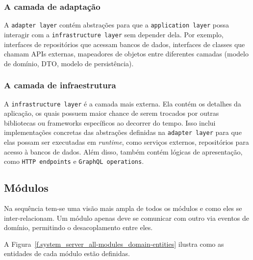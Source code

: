 \subsubsection{A camada de adaptação}

A \texttt{adapter layer} contém abstrações para que a \texttt{application layer} possa interagir com a \texttt{infrastructure layer} sem depender dela. Por exemplo, interfaces de repositórios que acessam bancos de dados, interfaces de classes que chamam APIs externas, mapeadores de objetos entre diferentes camadas (modelo de domínio, DTO, modelo de persistência).

\subsubsection{A camada de infraestrutura}

A \texttt{infrastructure layer} é a camada mais externa. Ela contém os detalhes da aplicação, os quais possuem maior chance de serem trocados por outras bibliotecas ou frameworks específicos ao decorrer do tempo. Isso inclui implementações concretas das abstrações definidas na \texttt{adapter layer} para que elas possam ser executadas em \emph{runtime}, como serviços externos, repositórios para acesso à bancos de dados. Além disso, também contém lógicas de apresentação, como \texttt{HTTP endpoints} e \texttt{GraphQL operations}.

\subsection{Módulos}

Na sequência tem-se uma visão mais ampla de todos os módulos e como eles se inter-relacionam. Um módulo apenas deve se comunicar com outro via eventos de domínio, permitindo o desacoplamento entre eles.

A Figura~\ref{f.system_server_all-modules_domain-entities} ilustra como as entidades de cada módulo estão definidas. 

